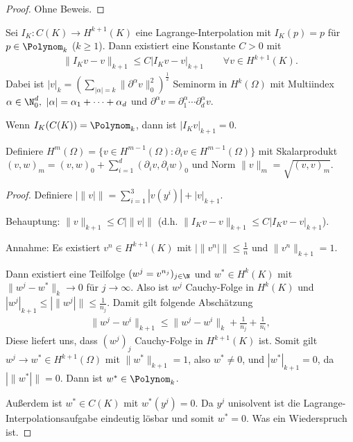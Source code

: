 \begin{proof}
    Ohne Beweis.
\end{proof}


\begin{Satz}
    \label{satz:4.6}
    Sei $I_K: C(K) \to H^{k+1}(K)$ eine Lagrange-Interpolation mit $I_K(p) = p$
    für $p\in \Polynom_k$ ($k \ge 1$).
    Dann existiert eine Konstante $C > 0$ mit
    \begin{eqnarray*}
        \|I_K v - v\|_{k+1} \le C |I_K v - v|_{k+1}
        \qquad \forall v\in H^{k+1}(K).
    \end{eqnarray*}
    Dabei ist $|v|_k = \left(\sum_{|\alpha| = k} \|\partial^\alpha v\|_0^2
    \right)^\frac{1}{2}$ Seminorm in $H^k(\Omega)$ mit Multiindex
    $\alpha\in \N_0^d, \ |\alpha| = \alpha_1 + \dots + \alpha_d$ und
    $\partial^\alpha v = \partial_1^\alpha \cdots \partial_d^\alpha v$.
\end{Satz}


\begin{Bemerkung}
    Wenn $I_K(C(K)) = \Polynom_k$, dann ist $|I_K v|_{k+1} = 0$. 
\end{Bemerkung}


\begin{Definition}
    Definiere
    $H^m(\Omega) = \{v\in H^{m-1}(\Omega): \partial_i v\in H^{m-1}(\Omega)\}$
    mit Skalarprodukt \\
    $(v, w)_m = (v, w)_0 + \sum_{i=1}^d (\partial_i v, \partial_iw)_0$ und Norm
    $\|v\|_m = \sqrt{(v, v)_m}$.
\end{Definition}


\begin{proof}
    Definiere $|\|v|\| = \sum_{i=1}^3 |v(y^i)| + |v|_{k+1}$.

    Behauptung: $\|v\|_{k+1} \le C |\|v|\|$
    (d.h. $\|I_K v - v\|_{k+1} \le C |I_K v - v|_{k+1}$).

    Annahme: Es existiert $v^n\in H^{k+1}(K)$ mit $|\|v^n|\| \le \frac{1}{n}$
    und $\|v^n\|_{k+1} = 1$.

    Dann existiert eine Teilfolge $(w^j = v ^{n_j})_{j\in\N}$ und
    $w^*\in H^k(K)$ mit $\|w^j - w^*\|_k \to 0$ für $ j \to \infty$.
    Also ist $w^j$ Cauchy-Folge in $H^k(K)$ und
    $|w^j|_{k+1} \le |\|w^j|\| \le \frac{1}{n_j}$.
    Damit gilt folgende Abschätzung
    \begin{eqnarray*}
        \|w^j - w^i\|_{k+1} \le \|w^j - w^i\|_k + \frac{1}{n_j} +\frac{1}{n_i},
    \end{eqnarray*}
    Diese liefert uns, dass $(w^j)_j$ Cauchy-Folge in $H^{k+1}(K)$ ist.
    Somit gilt $w^j \to w^*\in H^{k+1}(\Omega)$ mit $\|w^*\|_{k+1} = 1$, also
    $w^* \neq 0$, und $|w^*|_{k+1} = 0$, da $|\|w^*|\| = 0$.
    Dann ist $w^*\in \Polynom_k$.

    Au\ss{}erdem ist $w^*\in C(K)$ mit $w^*(y^j) = 0$.
    Da $y^j$ unisolvent ist die Lagrange-Interpolationsaufgabe eindeutig
    lösbar und somit $w^* = 0$.
    Was ein Wiederspruch ist.
\end{proof}


